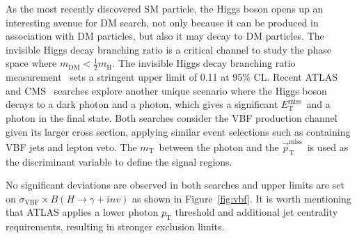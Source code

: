 \documentclass{moriond}
\def\mt{m_{\mathrm{T}}}
\def\et{E_\mathrm{T}^{\mathrm{miss}}}
\def\ptmiss{\vec{p}_\mathrm{T}^{\mathrm{miss}}}
\begin{document}
As the most recently discovered SM particle, the Higgs boson opens up an
interesting avenue for DM search, not only because it can be produced in
association with DM particles, but also it may decay to DM particles. The
invisible Higgs decay branching ratio is a critical channel to study the
phase space where $m_{\mathrm{DM}} < \frac{1}{2}m_{\mathrm{H}}$. The invisible Higgs decay branching ratio measurement~\cite{hinv} sets a stringent
upper limit of 0.11 at 95\% CL. Recent ATLAS~\cite{atlasvbf} and
CMS~\cite{cmsvbf} searches explore another unique scenario where the Higgs boson
decays to a dark photon and a photon, which gives a significant $\et$\ and a photon
in the final state. Both searches consider the VBF production channel given its
larger cross section, applying similar event selections such as containing VBF
jets and lepton veto. The $\mt$\ between the photon and the $\ptmiss$\ is used
as the discriminant variable to define the signal regions. 

No significant deviations are observed in both searches and upper limits are set on $\sigma_{\mathrm{VBF}}\times B(H\rightarrow\gamma+inv)$ as shown in Figure~\ref{fig:vbf}. It is worth mentioning that ATLAS applies a lower photon $p_{\mathrm{T}}$ threshold and
additional jet centrality requirements, resulting in stronger exclusion limits.  
\end{document}
